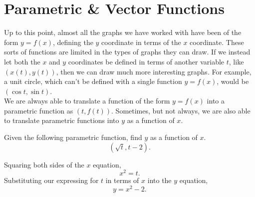 \section{Parametric \& Vector Functions}
Up to this point, almost all the graphs we have worked with have been of the form $y=f(x)$, defining the $y$ coordinate in terms of the $x$ coordinate.
These sorts of functions are limited in the types of graphs they can draw.
If we instead let both the $x$ and $y$ coordinates be defined in terms of another variable $t$, like $(x(t),y(t))$, then we can draw much more interesting graphs.
For example, a unit circle, which can't be defined with a single function $y=f(x)$, would be $(\cos{t}, \sin{t})$. \\

\noindent
We are always able to translate a function of the form $y=f(x)$ into a parametric function as $(t, f(t))$.
Sometimes, but not always, we are also able to translate parametric functions into $y$ as a function of $x$.

\begin{example}
	Given the following parametric function, find $y$ as a function of $x$.
	\begin{equation*}
		(\sqrt{t}, t-2).
	\end{equation*}
\end{example}
Squaring both sides of the $x$ equation,
\begin{equation*}
	x^2 = t.
\end{equation*}
\indent
Substituting our expressing for $t$ in terms of $x$ into the $y$ equation,
\begin{equation*}
	y = x^2 - 2.
\end{equation*}

